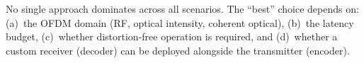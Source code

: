 \begin{keyinsight}
    No single approach dominates across all scenarios.  The ``best'' choice
    depends on: (a)~the OFDM domain (RF, optical intensity, coherent optical),
    (b)~the latency budget, (c)~whether distortion-free operation is required,
    and (d)~whether a custom receiver (decoder) can be deployed alongside the
    transmitter (encoder).
\end{keyinsight}
